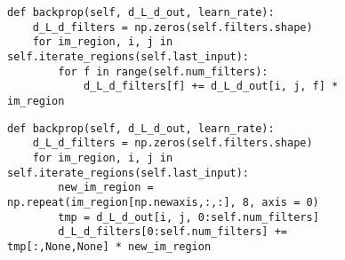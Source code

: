 

    





\begin{figure}[t]
\begin{lstlisting}[caption={Interaction inefficiency in CNN-from-Scratch due to slice underutilization.},label=lst:case1_org]
def backprop(self, d_L_d_out, learn_rate):
    d_L_d_filters = np.zeros(self.filters.shape)
    for im_region, i, j in self.iterate_regions(self.last_input):
        for f in range(self.num_filters):
            d_L_d_filters[f] += d_L_d_out[i, j, f] * im_region
\end{lstlisting}
\end{figure}



\begin{figure}[t]
\begin{lstlisting}[caption={Optimized code of Listing~\ref{lst:case1_org}, eliminates inefficiencies by performing slice notation.},label=lst:case1_opt]
def backprop(self, d_L_d_out, learn_rate):
    d_L_d_filters = np.zeros(self.filters.shape)
    for im_region, i, j in self.iterate_regions(self.last_input):
        new_im_region = np.repeat(im_region[np.newaxis,:,:], 8, axis = 0)
        tmp = d_L_d_out[i, j, 0:self.num_filters]
        d_L_d_filters[0:self.num_filters] += tmp[:,None,None] * new_im_region
\end{lstlisting}
\end{figure}



